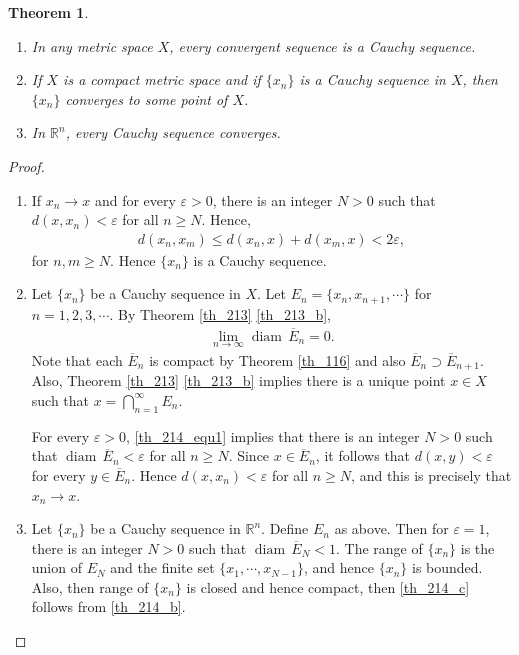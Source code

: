 \documentclass[10pt]{book}
\newtheorem{theorem}{Theorem}[chapter]
\theoremstyle{definition}
\numberwithin{equation}{chapter}
\def\diam{{\operatorname{diam}\,}}
\begin{document}
\begin{theorem}\label{th_214}
~\begin{enumerate}[label=(\alph*)]
    \item In any metric space $X$, every convergent sequence is a Cauchy sequence. \label{th_214_a}
    
    \item If $X$ is a compact metric space and if $\{x_n\}$ is a Cauchy sequence in $X$, then $\{x_n\}$ converges to some point of $X$. \label{th_214_b}
    
    \item In $\mathbb{R}^n$, every Cauchy sequence converges. \label{th_214_c}
\end{enumerate}
\end{theorem}
\begin{proof}
~\begin{enumerate}[label=(\alph*)]
    \item If $x_n \to x$ and for every $\varepsilon > 0$, there is an integer $N > 0$ such that $d(x,x_n) < \varepsilon$ for all $n \geq N$. Hence, 
    \begin{align*}
        d(x_n,x_m) \leq d(x_n,x) + d(x_m,x) < 2 \varepsilon,
    \end{align*}
    for $n,m \geq N$. Hence $\{x_n\}$ is a Cauchy sequence.
    
    \item Let $\{x_n\}$ be a Cauchy sequence in $X$. Let $E_n = \{x_n, x_{n+1}, \cdots\}$ for $n = 1,2,3,\cdots$. By Theorem \ref{th_213} \ref{th_213_b}, \begin{align}\label{th_214_equ1}
        \lim_{n\to\infty} \diam \overline{E}_n = 0.
    \end{align}
    Note that each $\overline{E}_n$ is compact by Theorem \ref{th_116} and also $\overline{E}_n \supset \overline{E}_{n+1}$. Also, Theorem \ref{th_213} \ref{th_213_b} implies there is a unique point $x \in X$ such that $x = \bigcap^\infty_{n=1} E_n$. 
    
    For every $\varepsilon > 0$, \eqref{th_214_equ1} implies that there is an integer $N > 0$ such that $\diam \overline{E}_n < \varepsilon$ for all $n \geq N$. Since $x \in \overline{E}_n$, it follows that $d(x,y) < \varepsilon$ for every $y \in \overline{E}_n$. Hence $d(x,x_n) < \varepsilon$ for all $n \geq N$, and this is precisely that $x_n \to x$. 
    
    \item Let $\{x_n\}$ be a Cauchy sequence in $\mathbb{R}^n$. Define $E_n$ as above. Then for $\varepsilon = 1$, there is an integer $N > 0$ such that $\diam \overline{E}_N < 1$. The range of $\{x_n\}$ is the union of $E_N$ and the finite set $\{x_1, \cdots, x_{N-1}\}$, and hence $\{x_n\}$ is bounded. Also, then range of $\{x_n\}$ is closed and hence compact, then \ref{th_214_c} follows from  \ref{th_214_b}.
\end{enumerate}
\end{proof}
\end{document}
